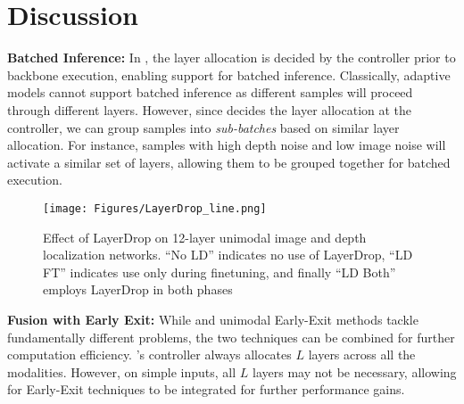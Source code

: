\section{Discussion}

\textbf{Batched Inference:}
In \name, the layer allocation is decided by the controller prior to backbone execution, enabling support for batched inference. Classically, adaptive models cannot support batched inference as different samples will proceed through different layers. However, since \name decides the layer allocation at the controller, we can group samples into \emph{sub-batches} based on similar layer allocation. For instance, samples with high depth noise and low image noise will activate a similar set of layers, allowing them to be grouped together for batched execution.

\begin{figure}
    \centering
    \texttt{[image: Figures/LayerDrop\_line.png]}
    \vspace{-10pt}
    \caption{Effect of LayerDrop on 12-layer unimodal image and depth localization networks. ``No LD'' indicates no use of LayerDrop, ``LD FT'' indicates use only during finetuning, and finally ``LD Both'' employs LayerDrop in both phases}
        \vspace{-0.2in}
    \label{fig:layerdrop_plot}
\end{figure}

\textbf{Fusion with Early Exit:}
While \name and unimodal Early-Exit methods tackle fundamentally different problems, the two techniques can be combined for further computation efficiency. \name's controller always allocates $L$ layers across all the modalities. However, on simple inputs, all $L$ layers may not be necessary, allowing for Early-Exit techniques to be integrated for further performance gains. 




